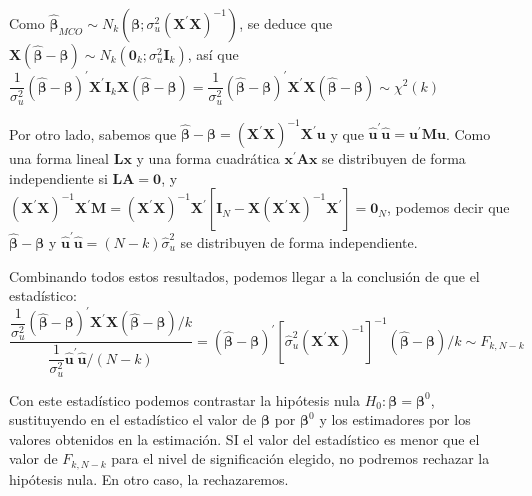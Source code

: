 Como $\hat{\boldsymbol{\beta}}_{MCO}\sim N_{k}\left(\boldsymbol{\beta};\sigma_{u}^{2}\left(\boldsymbol{X}^{\prime}\boldsymbol{X}\right)^{-1}\right)$,
se deduce que $\boldsymbol{X}\left(\hat{\boldsymbol{\beta}}-\boldsymbol{\beta}\right)\sim N_{k}\left(\boldsymbol{0}_{k};\sigma_{u}^{2}\boldsymbol{I}_{k}\right)$,
as\'i que $\dfrac{1}{\sigma_{u}^{2}}\left(\hat{\boldsymbol{\beta}}-\boldsymbol{\beta}\right)^{\prime}\boldsymbol{X}^{\prime}\boldsymbol{I}_{k}\boldsymbol{X}\left(\hat{\boldsymbol{\beta}}-\boldsymbol{\beta}\right)=\dfrac{1}{\sigma_{u}^{2}}\left(\hat{\boldsymbol{\beta}}-\boldsymbol{\beta}\right)^{\prime}\boldsymbol{X}^{\prime}\boldsymbol{X}\left(\hat{\boldsymbol{\beta}}-\boldsymbol{\beta}\right)\sim\chi^{2}(k)$

Por otro lado, sabemos que $\hat{\boldsymbol{\beta}}-\boldsymbol{\beta}=\left(\boldsymbol{X}^{\prime}\boldsymbol{X}\right)^{-1}\boldsymbol{X}^{\prime}\boldsymbol{u}$
y que $\hat{\boldsymbol{u}}^{\prime}\hat{\boldsymbol{u}}=\boldsymbol{u}^{\prime}\boldsymbol{M}\boldsymbol{u}$.
Como una forma lineal $\boldsymbol{L}\boldsymbol{x}$ y una forma
cuadr\'atica $\boldsymbol{x}^{\prime}\boldsymbol{A}\boldsymbol{x}$ se distribuyen
de forma independiente si $\boldsymbol{LA}=\boldsymbol{0}$, y $\left(\boldsymbol{X}^{\prime}\boldsymbol{X}\right)^{-1}\boldsymbol{X}^{\prime}\boldsymbol{M}=\left(\boldsymbol{X}^{\prime}\boldsymbol{X}\right)^{-1}\boldsymbol{X}^{\prime}\left[\boldsymbol{I}_{N}-\boldsymbol{X}\left(\boldsymbol{X}^{\prime}\boldsymbol{X}\right)^{-1}\boldsymbol{X}^{\prime}\right]=\boldsymbol{0}_{N}$,
podemos decir que $\hat{\boldsymbol{\beta}}-\boldsymbol{\beta}$ y
$\hat{\boldsymbol{u}}^{\prime}\hat{\boldsymbol{u}}=\left(N-k\right)\hat{\sigma}_{u}^{2}$
se distribuyen de forma independiente.

Combinando todos estos resultados, podemos llegar a la conclusi\'on
de que el estad\'istico:
\[
\dfrac{\dfrac{1}{\sigma_{u}^{2}}\left(\hat{\boldsymbol{\beta}}-\boldsymbol{\beta}\right)^{\prime}\boldsymbol{X}^{\prime}\boldsymbol{X}\left(\hat{\boldsymbol{\beta}}-\boldsymbol{\beta}\right)/k}{\dfrac{1}{\sigma_{u}^{2}}\hat{\boldsymbol{u}}^{\prime}\hat{\boldsymbol{u}}/\left(N-k\right)}=\left(\hat{\boldsymbol{\beta}}-\boldsymbol{\beta}\right)^{\prime}\left[\hat{\sigma}_{u}^{2}\left(\boldsymbol{X}^{\prime}\boldsymbol{X}\right)^{-1}\right]^{-1}\left(\hat{\boldsymbol{\beta}}-\boldsymbol{\beta}\right)/k\sim F_{k,N-k}
\]


Con este estad\'istico podemos contrastar la hip\'otesis nula $H_{0}:\boldsymbol{\beta}=\boldsymbol{\beta}^{0}$,
sustituyendo en el estad\'istico el valor de $\boldsymbol{\beta}$ por
$\boldsymbol{\beta}^{0}$ y los estimadores por los valores obtenidos
en la estimaci\'on. SI el valor del estad\'istico es menor que el valor
de $F_{k,N-k}$ para el nivel de significaci\'on elegido, no podremos
rechazar la hip\'otesis nula. En otro caso, la rechazaremos.


